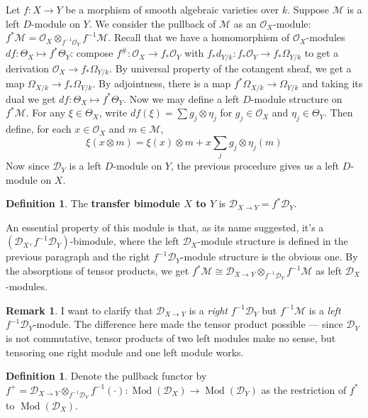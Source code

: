 \documentclass[11pt, a4paper]{article}
\theoremstyle{definition}
\newtheorem{remark}[theorem]{Remark}
\newtheorem{definition}[theorem]{Definition}
\newcommand{\Mod}{\operatorname{Mod}}
\begin{document}
    Let $f:X\to Y$ be a morphism of smooth algebraic varieties over $k$. Suppose $\mathcal M$ is a left $D$-module on $Y$. We consider the pullback of $\mathcal M$ as an $\mathcal O_X$-module: $f^*\mathcal M=\mathcal O_X\otimes_{f^{-1}\mathcal O_Y}f^{-1}\mathcal M$. Recall that we have a homomorphism of $\mathcal O_X$-modules $df:\Theta_X\mapsto f^*\Theta_Y$: compose $f^\#:\mathcal O_X\to f_*\mathcal O_Y$ with $f_*d_{Y/k}:f_*\mathcal O_Y\to f_*\Omega_{Y/k}$ to get a derivation $\mathcal O_X\to f_*\Omega_{Y/k}$. By universal property of the cotangent sheaf, we get a map $\Omega_{X/k}\to f_*\Omega_{Y/k}$. By adjointness, there is a map $f^*\Omega_{X/k}\to\Omega_{Y/k}$ and taking its dual we get $df:\Theta_X\mapsto f^*\Theta_Y$. Now we may define a left $D$-module structure on $f^*\mathcal M$. For any $\xi\in\Theta_X$, write $df(\xi)=\sum g_j\otimes\eta_j$ for $g_j\in\mathcal O_X$ and $\eta_j\in\Theta_Y$. Then define, for each $x\in\mathcal O_X$ and $m\in\mathcal M$,
    \[\xi(x\otimes m)=\xi(x)\otimes m+x\sum_{j}g_j\otimes \eta_j(m)\]
    Now since $\mathcal D_Y$ is a left $D$-module on $Y$, the previous procedure gives us a left $D$-module on $X$.
    \begin{definition}
        The \textbf{transfer bimodule $X$ to $Y$} is $\mathcal D_{X\to Y}=f^*\mathcal D_Y$.
    \end{definition}
    An essential property of this module is that, as its name suggested, it's a $(\mathcal D_X, f^{-1}\mathcal D_Y)$-bimodule, where the left $\mathcal D_X$-module structure is defined in the previous paragraph and the right $f^{-1}\mathcal D_Y$-module structure is the obvious one. By the absorptions of tensor products, we get $f^*\mathcal M\cong \mathcal D_{X\to Y}\otimes_{f^{-1}\mathcal D_Y}f^{-1}\mathcal M$ as left $\mathcal D_X$-modules. 
    \begin{remark}
        I want to clarify that $\mathcal D_{X\to Y}$ is a \textit{right} $f^{-1}\mathcal D_Y$ but $f^{-1}\mathcal M$ is a \textit{left} $f^{-1}\mathcal D_Y$-module. The difference here made the tensor product possible --- since $\mathcal D_Y$ is not commutative, tensor products of two left modules make no sense, but tensoring one right module and one left module works.
    \end{remark}
    \begin{definition}
        Denote the pullback functor by $f^+=\mathcal D_{X\to Y}\otimes_{f^{-1}\mathcal D_Y}f^{-1}(\cdot):\Mod(\mathcal D_X)\to\Mod(\mathcal D_Y)$ as the restriction of $f^*$ to $\Mod(\mathcal D_X)$.
    \end{definition}
\end{document}
